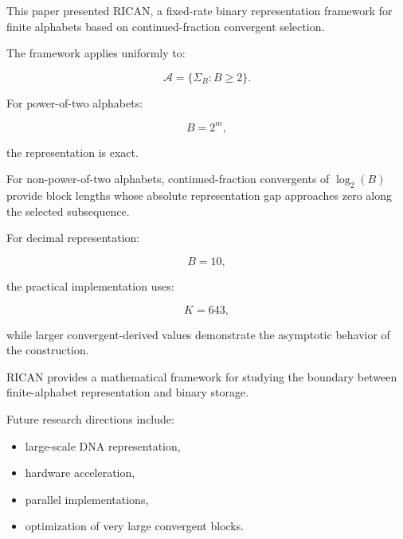 \documentclass[onecolumn]{IEEEtran}
\begin{document}
This paper presented RICAN, a fixed-rate binary representation
framework for finite alphabets based on continued-fraction convergent
selection.

The framework applies uniformly to:

\[
\mathcal{A}
=
\{\Sigma_B:B\geq2\}.
\]

For power-of-two alphabets:

\[
B=2^m,
\]

the representation is exact.

For non-power-of-two alphabets, continued-fraction convergents of
$\log_2(B)$ provide block lengths whose absolute representation gap
approaches zero along the selected subsequence.

For decimal representation:

\[
B=10,
\]

the practical implementation uses:

\[
K=643,
\]

while larger convergent-derived values demonstrate the asymptotic
behavior of the construction.

RICAN provides a mathematical framework for studying the boundary
between finite-alphabet representation and binary storage.

Future research directions include:

\begin{itemize}

\item large-scale DNA representation,

\item hardware acceleration,

\item parallel implementations,

\item optimization of very large convergent blocks.

\end{itemize}

\end{document}
